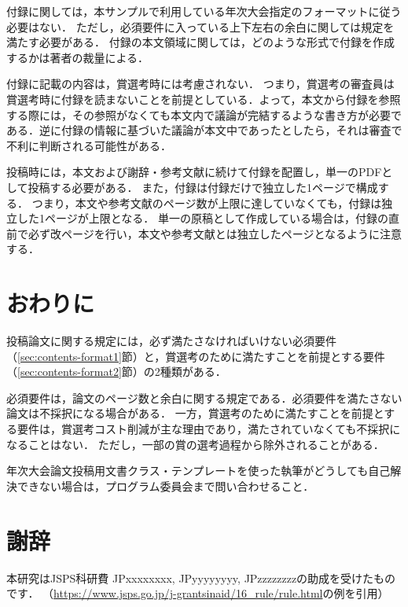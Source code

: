 \documentclass[
  platex, dvipdfmx,  %
]{nlp2024}
\begin{document}
付録に関しては，本サンプルで利用している年次大会指定のフォーマットに従う必要はない．
ただし，必須要件に入っている上下左右の余白に関しては規定を満たす必要がある．
付録の本文領域に関しては，どのような形式で付録を作成するかは著者の裁量による．

付録に記載の内容は，賞選考時には考慮されない．
つまり，賞選考の審査員は賞選考時に付録を読まないことを前提としている．よって，本文から付録を参照する際には，その参照がなくても本文内で議論が完結するような書き方が必要である．逆に付録の情報に基づいた議論が本文中であったとしたら，それは審査で不利に判断される可能性がある．



投稿時には，本文および謝辞・参考文献に続けて付録を配置し，単一のPDFとして投稿する必要がある．
また，付録は付録だけで独立した1ページで構成する．
つまり，本文や参考文献のページ数が上限に達していなくても，付録は独立した1ページが上限となる．
単一の原稿として作成している場合は，付録の直前で必ず改ページを行い，本文や参考文献とは独立したページとなるように注意する．


\section{おわりに}
投稿論文に関する規定には，必ず満たさなければいけない必須要件（\ref{sec:contents-format1}節）と，賞選考のために満たすことを前提とする要件（\ref{sec:contents-format2}節）の2種類がある．

必須要件は，論文のページ数と余白に関する規定である．必須要件を満たさない論文は不採択になる場合がある．
一方，賞選考のために満たすことを前提とする要件は，賞選考コスト削減が主な理由であり，満たされていなくても不採択になることはない．
ただし，一部の賞の選考過程から除外されることがある．

年次大会論文投稿用文書クラス・テンプレートを使った執筆がどうしても自己解決できない場合は，プログラム委員会まで問い合わせること．





\newpage
\section*{謝辞}

本研究はJSPS科研費 JPxxxxxxxx, JPyyyyyyyy, JPzzzzzzzzの助成を受けたものです．
（\url{https://www.jsps.go.jp/j-grantsinaid/16_rule/rule.html}の例を引用）



\end{document}
